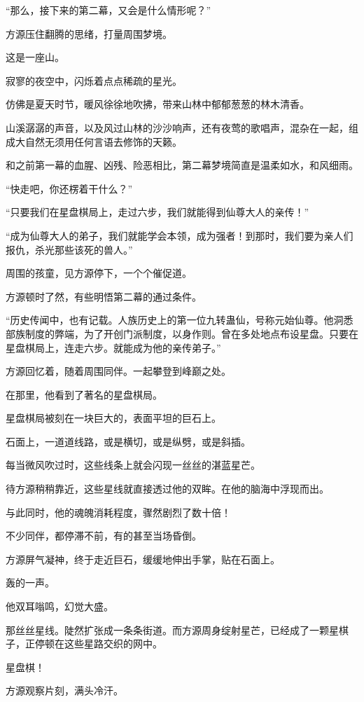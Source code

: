\begin{this_body}
“那么，接下来的第二幕，又会是什么情形呢？”

方源压住翻腾的思绪，打量周围梦境。

这是一座山。

寂寥的夜空中，闪烁着点点稀疏的星光。

仿佛是夏天时节，暖风徐徐地吹拂，带来山林中郁郁葱葱的林木清香。

山溪潺潺的声音，以及风过山林的沙沙响声，还有夜莺的歌唱声，混杂在一起，组成大自然无须用任何言语去修饰的天籁。

和之前第一幕的血腥、凶残、险恶相比，第二幕梦境简直是温柔如水，和风细雨。

“快走吧，你还楞着干什么？”

“只要我们在星盘棋局上，走过六步，我们就能得到仙尊大人的亲传！”

“成为仙尊大人的弟子，我们就能学会本领，成为强者！到那时，我们要为亲人们报仇，杀光那些该死的兽人。”

周围的孩童，见方源停下，一个个催促道。

方源顿时了然，有些明悟第二幕的通过条件。

“历史传闻中，也有记载。人族历史上的第一位九转蛊仙，号称元始仙尊。他洞悉部族制度的弊端，为了开创门派制度，以身作则。曾在多处地点布设星盘。只要在星盘棋局上，连走六步。就能成为他的亲传弟子。”

方源回忆着，随着周围同伴。一起攀登到峰巅之处。

在那里，他看到了著名的星盘棋局。

星盘棋局被刻在一块巨大的，表面平坦的巨石上。

石面上，一道道线路，或是横切，或是纵劈，或是斜插。

每当微风吹过时，这些线条上就会闪现一丝丝的湛蓝星芒。

待方源稍稍靠近，这些星线就直接透过他的双眸。在他的脑海中浮现而出。

与此同时，他的魂魄消耗程度，骤然剧烈了数十倍！

不少同伴，都停滞不前，有的甚至当场昏倒。

方源屏气凝神，终于走近巨石，缓缓地伸出手掌，贴在石面上。

轰的一声。

他双耳嗡鸣，幻觉大盛。

那丝丝星线。陡然扩张成一条条街道。而方源周身绽射星芒，已经成了一颗星棋子，正停顿在这些星路交织的网中。

星盘棋！

方源观察片刻，满头冷汗。


\end{this_body}
